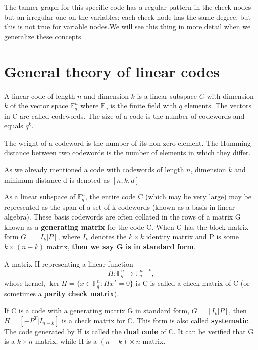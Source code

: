 The tanner graph for this specific code has a regular pattern in the check nodes but an irregular one on the variables: each check node has the same degree, but this is not true for variable nodes.We will see this thing in more detail when we generalize these concepts. 
 
\section{General theory of linear codes}

\begin{definition}
	A linear code of length $n$ and dimension $k$ is a linear subspace $C$ with dimension $k$ of the vector space $\mathbb {F}_{q}^{n}$ where $\mathbb {F}_{q}$ is the finite field with $q$ elements.
	The vectors in C are called codewords. The size of a code is the number of codewords and equals $q^k$.
\end{definition}

\begin{definition}
	The weight of a codeword is the number of its non zero element.
	The Humming distance between two codewords is the number of elements in which they differ.  
\end{definition}

As we already mentioned a code with codewords of length $n$, dimension $k$ and minimum distance d is denoted as $[n,k,d]$

\begin{definition}
	As a linear subspace of $\mathbb{F}_{q}^{n}$, the entire code C (which may be very large) may be represented as the span of a set of k codewords (known as a basis in linear algebra). These basis codewords are often collated in the rows of a matrix G known as a \textbf{generating matrix} for the code C. When G has the block matrix form $G=[I_{k}|P]$, where $I_{k}$ denotes the $k\times k$ identity matrix and P is some $k \times (n-k)$ matrix, \textbf{then we say G is in standard form}.
	
	A matrix H representing a linear function 
	\begin{equation}
	H :\mathbb {F}_{q}^{n} \to \mathbb {F}_{q}^{n-k},
	\end{equation} 
	whose kernel, $\ker H = \{x \in \mathbb{F}^n_q: H x^T = 0\}$  is C is called a check matrix of C (or sometimes a \textbf{parity check matrix}). 
	
	If C is a code with a generating matrix G in standard form, $G=[I_{k}|P]$, then $H=[-P^{T}|I_{n-k}]$ is a check matrix for C. This form is also called \textbf{systematic}. The code generated by H is called the \textbf{dual code} of C. It can be verified that G is a $k\times n$ matrix, while H is a $(n-k)\times n$ matrix.
\end{definition}

